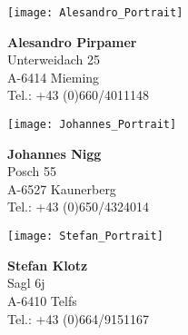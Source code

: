 
\begin{team} 

\begin{figure}[htbp]
  \centering
  \begin{minipage}[h]{8 cm}
\texttt{[image: Alesandro\_Portrait]}
  \end{minipage}
  \begin{minipage}[h]{5 cm}
 
\textbf{Alesandro Pirpamer}\\
Unterweidach 25\\
A-6414 Mieming\\
Tel.: +43 (0)660/4011148
 
  \end{minipage}
\end{figure}

\begin{figure}[htbp]
  \centering
  \begin{minipage}[h]{8 cm}
\texttt{[image: Johannes\_Portrait]}
  \end{minipage}
  \begin{minipage}[h]{5 cm}
 
\textbf{Johannes Nigg}\\
Posch 55\\
A-6527 Kaunerberg\\
Tel.: +43 (0)650/4324014
 
  \end{minipage}
\end{figure}

\begin{figure}[htbp]
  \centering
  \begin{minipage}[h]{8 cm}
\texttt{[image: Stefan\_Portrait]}
  \end{minipage}
  \begin{minipage}[h]{5 cm}
 
\textbf{Stefan Klotz}\\
Sagl 6j\\
A-6410 Telfs\\
Tel.: +43 (0)664/9151167
 
  \end{minipage}
\end{figure}

\end{team}

